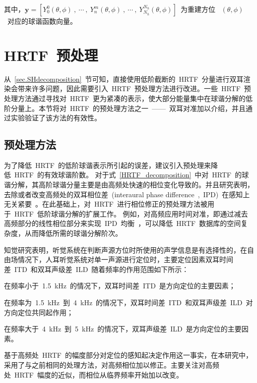 其中，$\bm{y} = \left[ Y_{0}^{0}(\theta,\phi)~,~ \cdots~,~Y_{n}^{m}(\theta,\phi)~,~\cdots~,~ Y_{N_{h}}^{N_{h}}(\theta,\phi)\right]$~为重建方位~ $(\theta,\phi)$~对应的球谐函数向量。

\section{HRTF~预处理}\label{sec.HRTF_pre}

从~\ref{sec.SHdecomposition}~节可知，直接使用低阶截断的~HRTF~分量进行双耳渲染会带来许多问题，因此需要引入~HRTF~预处理方法进行改进。一些~HRTF~预处理方法通过寻找对~HRTF~更为紧凑的表示，使大部分能量集中在球谐分解的低阶分量上。本节将对~HRTF~的预处理方法之一~——~双耳对准加以介绍，并且通过实验验证了该方法的有效性。




\subsection{预处理方法}

为了降低~HRTF~的低阶球谐表示所引起的误差，建议引入预处理来降低~HRTF~的有效球谐阶数。
对于式~\eqref{HRTF_decomposition}~中对~HRTF~的球谐分解，其高阶球谐分量主要是由高频处快速的相位变化导致的。并且研究表明，去除或者改变高频处的双耳相位差~(interaural phase difference~,~IPD)~在感知上无关紧要~。在此基础上，对~HRTF~进行相位修正的预处理方法被用于~HRTF~低阶球谐分解的扩展工作。
例如，对高频应用时间对准，即通过减去高频部分的线性相位部分来实现~IPD~均衡~，可以降低~HRTF~数据库的空间复杂度，从而降低所需的球谐分解阶次。


知觉研究表明，听觉系统在判断声源方位时所使用的声学信息是有选择性的，在自由场情况下，人耳听觉系统对单一声源进行定位时，主要定位因素双耳时间差~ITD~和双耳声级差~ILD~随着频率的作用范围如下所示：
\begin{compactitem}
\item 在频率小于~1.5~kHz~的情况下，双耳时间差~ITD~是方向定位的主要因素；
\item 在频率为~1.5~kHz~到~4~kHz~的情况下，双耳时间差~ITD~和双耳声级差~ILD~对方向定位共同起作用；
\item 在频率大于~4~kHz~到~5~kHz~的情况下，双耳声级差~ILD~是方向定位的主要因素。
\end{compactitem}


基于高频处~HRTF~的幅度部分对定位的感知起决定作用这一事实，在本研究中，采用了与之前相同的处理方法，对高频相位加以修正。主要关注对高频处~HRTF~幅度的近似，而相位从临界频率开始加以改变。

